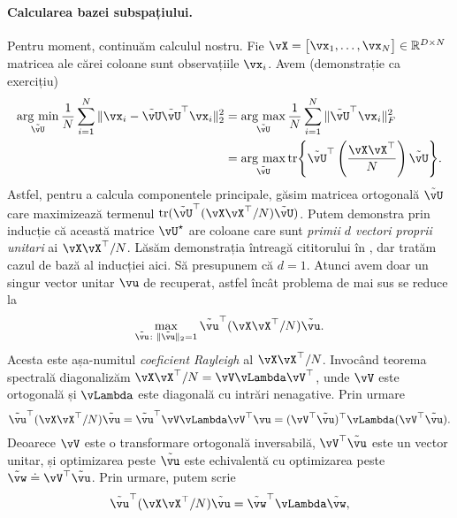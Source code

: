\documentclass[../../book-main_ro.tex]{subfiles}
\begin{document}
\paragraph{Calcularea bazei subspațiului.}
Pentru moment, continuăm calculul nostru. Fie \(\vX = \mat{\vx_{1}, \dots, \vx_{N}} \in \R^{D \times N}\) matricea ale cărei coloane sunt observațiile \(\vx_{i}\). Avem (demonstrație ca exercițiu)
\begin{align}
    \argmin_{\tilde{\vU}}\frac{1}{N}\sum_{i = 1}^{N}\norm{\vx_{i} - \tilde{\vU}\tilde{\vU}^{\top}\vx_{i}}_{2}^{2}
    &= \argmax_{\tilde{\vU}}\frac{1}{N}\sum_{i = 1}^{N}\norm{\tilde{\vU}^{\top}\vx_{i}}_{F}^{2} \\ 
    &= \argmax_{\tilde{\vU}}\tr\rc{\tilde{\vU}^{\top}\bp{\frac{\vX\vX^{\top}}{N}}\tilde{\vU}}.
\end{align}
Astfel, pentru a calcula componentele principale, găsim matricea ortogonală
\(\tilde{\vU}\) care maximizează termenul
\(\tr(\tilde{\vU}^{\top}(\vX\vX^{\top}/N)\tilde{\vU})\). Putem demonstra prin
inducție că această matrice \(\vU^{\star}\) are coloane care sunt \textit{primii \(d\) vectori proprii unitari} ai \(\vX\vX^{\top}/N\). Lăsăm demonstrația întreagă cititorului în , dar tratăm cazul de bază al inducției aici. Să presupunem că \(d = 1\). Atunci avem doar un singur vector unitar \(\vu\) de recuperat, astfel încât problema de mai sus se reduce la
\begin{equation}
    \max_{\tilde{\vu} \colon \norm{\tilde{\vu}}_{2} = 1} \tilde{\vu}^{\top}(\vX\vX^{\top}/N)\tilde{\vu}.
\end{equation}
Acesta este așa-numitul \textit{coeficient Rayleigh} al \(\vX\vX^{\top}/N\). Invocând teorema spectrală diagonalizăm \(\vX\vX^{\top}/N = \vV\vLambda\vV^{\top}\), unde \(\vV\) este ortogonală și \(\vLambda\) este diagonală cu intrări nenagative. Prin urmare 
\begin{equation}
    \tilde{\vu}^{\top}(\vX\vX^{\top}/N)\tilde{\vu} = \tilde{\vu}^{\top}\vV\vLambda\vV^{\top}\vu = (\vV^{\top}\tilde{\vu})^{\top}\vLambda(\vV^{\top}\tilde{\vu}).
\end{equation}
Deoarece \(\vV\) este o transformare ortogonală inversabilă, \(\vV^{\top}\tilde{\vu}\) este un vector unitar, și optimizarea peste \(\tilde{\vu}\) este echivalentă cu optimizarea peste \(\tilde{\vw} \doteq \vV^{\top}\tilde{\vu}\). Prin urmare, putem scrie
\begin{equation}
    \tilde{\vu}^{\top}(\vX\vX^{\top}/N)\tilde{\vu} = \tilde{\vw}^{\top}\vLambda\tilde{\vw},
\end{equation}
\end{document}
